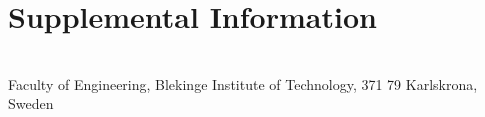 \documentclass[a4paper,twoside]{bth}
\newcommand{\faculty}{Engineering}
\begin{document}




\appendix
\chapter{Supplemental Information}


\cleardoublepage
\thispagestyle{empty}
\vspace*{\fill}
\clearpage{\thispagestyle{empty}}
\changepage{3cm}{1cm}{-0.5cm}{-0.5cm}{}{-1.5cm}{}{}{}
\vspace*{\fill}
\center

{\bthcsnotextlogo{3cm}}
\\
\noindent\makebox[\linewidth]{\rule{\textwidth}{1pt}} 
Faculty of \faculty, Blekinge Institute of Technology, 371 79 Karlskrona, Sweden
\end{document}
